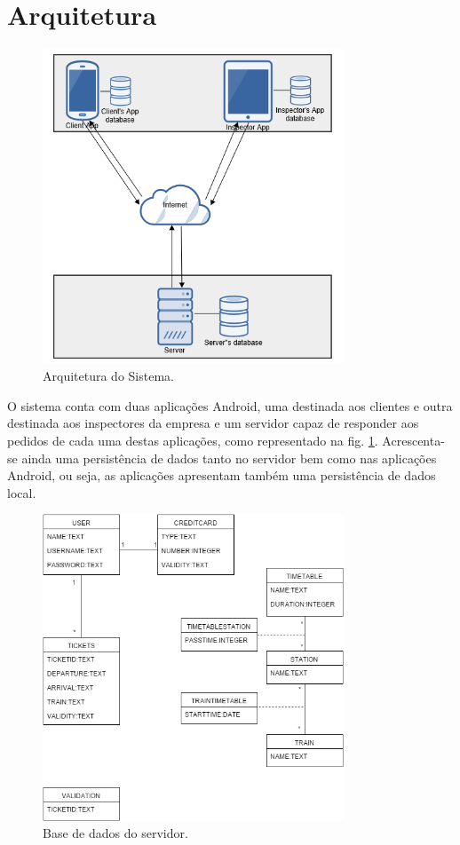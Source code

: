 \documentclass[12pt]{article}
\begin{document}
\section{Arquitetura}

\begin{figure}[h!]
    \centering
    \includegraphics[width=0.8\textwidth]{arch.png}
    \caption{Arquitetura do Sistema.}
    \label{fig:arch}
\end{figure}

O sistema conta com duas aplicações Android, uma destinada aos clientes e outra destinada aos inspectores da empresa e um servidor capaz de responder aos pedidos de cada uma destas aplicações, como representado na fig. \ref{fig:arch}. Acrescenta-se ainda uma persistência de dados tanto no servidor bem como nas aplicações Android, ou seja, as aplicações apresentam também uma persistência de dados local.

\begin{figure}[h!]
	\centering
	\includegraphics[width=0.8\textwidth]{db.png}
	\caption{Base de dados do servidor.}
	\label{fig:db}
\end{figure}
\end{document}
